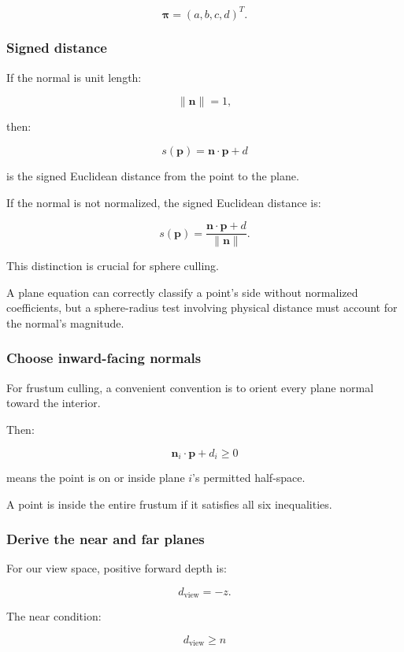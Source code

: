 \[
 \boxed{ \boldsymbol\pi=(a,b,c,d)^T }.
\]

\subsubsection{Signed distance}\label{signed-distance}

If the normal is unit length:

\[
 \|\mathbf n\|=1,
\]

then:

\[
 \boxed{ s(\mathbf p)=\mathbf n\cdot\mathbf p+d }
\]

is the signed Euclidean distance from the point to the plane.

If the normal is not normalized, the signed Euclidean distance is:

\[
 \boxed{ s(\mathbf p)= \frac{\mathbf n\cdot\mathbf p+d}{\|\mathbf n\|} }.
\]

This distinction is crucial for sphere culling.

A plane equation can correctly classify a point's side without normalized coefficients, but a sphere-radius test involving physical distance must account for the normal's magnitude.

\subsubsection{Choose inward-facing normals}\label{choose-inward-facing-normals}

For frustum culling, a convenient convention is to orient every plane normal toward the interior.

Then:

\[
 \boxed{ \mathbf n_i\cdot\mathbf p+d_i\ge0 }
\]

means the point is on or inside plane \(i\)'s permitted half-space.

A point is inside the entire frustum if it satisfies all six inequalities.

\subsubsection{Derive the near and far planes}\label{derive-the-near-and-far-planes}

For our view space, positive forward depth is:

\[
 d_{\mathrm{view}}=-z.
\]

The near condition:

\[
 d_{\mathrm{view}}\ge n
\]

